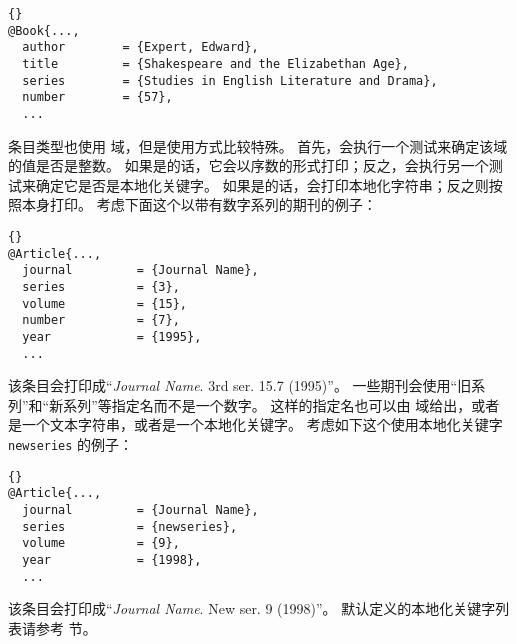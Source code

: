 \begin{lstlisting}[style=bibtex]{}
@Book{...,
  author        = {Expert, Edward},
  title         = {Shakespeare and the Elizabethan Age},
  series        = {Studies in English Literature and Drama},
  number        = {57},
  ...
\end{lstlisting}
%
 条目类型也使用  域，但是使用方式比较特殊。
首先，会执行一个测试来确定该域的值是否是整数。
如果是的话，它会以序数的形式打印；反之，会执行另一个测试来确定它是否是本地化关键字。
如果是的话，会打印本地化字符串；反之则按照本身打印。
考虑下面这个以带有数字系列的期刊的例子：

\begin{lstlisting}[style=bibtex]{}
@Article{...,
  journal         = {Journal Name},
  series          = {3},
  volume          = {15},
  number          = {7},
  year            = {1995},
  ...
\end{lstlisting}
%
该条目会打印成“\emph{Journal Name}. 3rd ser. 15.7 (1995)”。
一些期刊会使用“旧系列”和“新系列”等指定名而不是一个数字。
这样的指定名也可以由  域给出，或者是一个文本字符串，或者是一个本地化关键字。
考虑如下这个使用本地化关键字 \texttt{newseries} 的例子：

\begin{lstlisting}[style=bibtex]{}
@Article{...,
  journal         = {Journal Name},
  series          = {newseries},
  volume          = {9},
  year            = {1998},
  ...
\end{lstlisting}
%
该条目会打印成“\emph{Journal Name}. New ser. 9 (1998)”。
默认定义的本地化关键字列表请参考  节。

